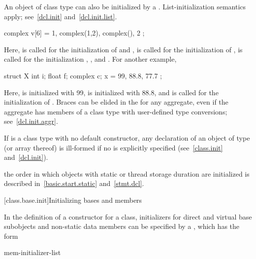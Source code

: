 \pnum
{}%
%
An object of class type can also be initialized by a
. List-initialization semantics apply;
see~\ref{dcl.init} and~\ref{dcl.init.list}. \enterexample

\begin{codeblock}
complex v[6] = { 1, complex(1,2), complex(), 2 };
\end{codeblock}

Here,
is called for the initialization of
and
,
is called for the initialization of
,
is called for the initialization
,
,
and
.
For another example,

\begin{codeblock}
struct X {
  int i;
  float f;
  complex c;
} x = { 99, 88.8, 77.7 };
\end{codeblock}

Here,
is initialized with 99,
is initialized with 88.8, and
is called for the initialization of
.
\exitexample
\enternote
Braces can be elided in the
for any aggregate, even if the aggregate has members of a class type with
user-defined type conversions; see~\ref{dcl.init.aggr}.
\exitnote

\pnum
\enternote
If
is a class type with no default constructor,
any declaration of an object of type
(or array thereof) is ill-formed if no
is explicitly specified (see~\ref{class.init} and~\ref{dcl.init}).
\exitnote

\pnum
\enternote
{}%
the order in which objects with static or thread storage duration
are initialized is described in~\ref{basic.start.static} and~\ref{stmt.dcl}.
\exitnote

[class.base.init]{Initializing bases and members}%
%

\pnum
In the definition of a constructor for a class,
initializers for direct and virtual base subobjects and
non-static data members can be specified by a
,
which has the form

\begin{bnf}
\br
    \terminal{:} mem-initializer-list
\end{bnf}

